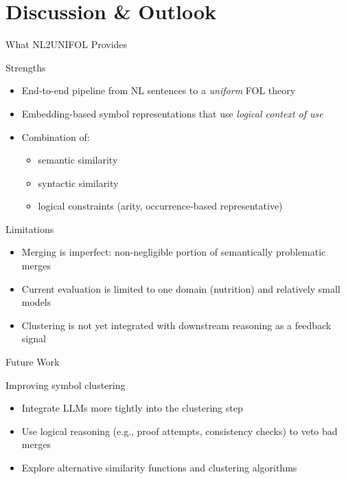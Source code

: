 \documentclass[presentation]{beamer}
\begin{document}
\section[Discussion]{Discussion \& Outlook}

{
\usebackgroundtemplate{}

\begin{frame}{What NL2UNIFOL Provides}

\begin{block}{Strengths}
\begin{itemize}
    \item End-to-end pipeline from NL sentences to a \emph{uniform} FOL theory
    \item Embedding-based symbol representations that use \emph{logical context of use}
    \item Combination of:
    \begin{itemize}
        \item semantic similarity
        \item syntactic similarity
        \item logical constraints (arity, occurrence-based representative)
    \end{itemize}
\end{itemize}
\end{block}

\begin{block}{Limitations}
\begin{itemize}
    \item Merging is imperfect: non-negligible portion of semantically problematic merges
    \item Current evaluation is limited to one domain (nutrition) and relatively small models
    \item Clustering is not yet integrated with downstream reasoning as a feedback signal
\end{itemize}
\end{block}

\end{frame}

\begin{frame}{Future Work}

\begin{block}{Improving symbol clustering}
\begin{itemize}
    \item Integrate LLMs more tightly into the clustering step
    \item Use logical reasoning (e.g., proof attempts, consistency checks) to veto bad merges
    \item Explore alternative similarity functions and clustering algorithms
\end{itemize}
\end{block}


\end{frame}}
\end{document}
